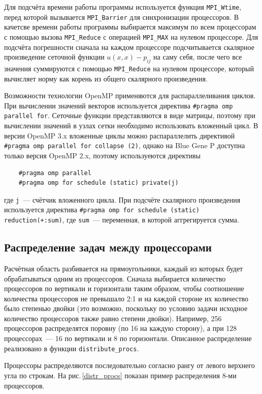 \documentclass[11pt]{article}
\numberwithin{equation}{section}
\theoremstyle{plain}
\theoremstyle{definition}
\begin{document}
Для подсчёта времени работы программы используется функция \verb|MPI_Wtime|,
перед которой вызывается \verb|MPI_Barrier| для синхронизации процессоров.
В качетсве времени работы программы выбирается максимум по всем процессорам
с помощью вызова \verb|MPI_Reduce| с операцией \verb|MPI_MAX| на нулевом
процессоре. Для подсчёта погрешности сначала на каждом процессоре
подсчитывается скалярное произведение сеточной функции $u(x, x)-p_{ij}$ на
саму себя, после чего все значения суммируются с помощью \verb|MPI_Reduce|
на нулевом процессоре, который вычисляет норму как корень из общего скалярного
произведения.

Возможности технологии OpenMP применяются для распараллеливания циклов.
При вычислении значений векторов используется директива
\verb|#pragma omp parallel for|. Сеточные функции представляются в виде
матрицы, поэтому при вычислении значений в узлах сетки необходимо использовать
вложенный цикл. В версии OpenMP 3.x вложенные циклы можно распараллелить
директивой \verb|#pragma omp parallel for collapse (2)|, однако на Blue Gene P
доступна только версия OpenMP 2.x, поэтому используеются директивы
\begin{verbatim}
    #pragma omp parallel
    #pragma omp for schedule (static) private(j)
\end{verbatim}
где \verb|j|~--- счётчик вложенного цикла.
При подсчёте скалярного произведения используется директива
\verb|#pragma omp for schedule (static) reduction(+:sum)|,
где \verb|sum|~--- переменная, в которой аггрегируется сумма.

\subsection{Распределение задач между процессорами}
Расчётная область разбивается на прямоугольники, каждый из которых будет
обрабатываться одним из процессоров. Сначала выбирается количество
процессоров по вертикали и горизонтали таким образом, чтобы соотношение
количества процессоров не превышало 2:1 и на каждой стороне их количество
было степенью двойки (это возможно, поскольку по условию задачи исходное
количество процессоров также равно степени двойки). Например, 256 процессоров
распределятся поровну (по 16 на каждую сторону), а при 128 процессорах~---
16 по вертикали и 8 по горизонтали.
Описанное распределение реализовано в функции \verb|distribute_procs|.

Процессоры распределяются последовательно согласно рангу от левого верхнего угла
по строкам. На рис.\,\ref{distr_procs} показан пример распределения 8-ми
процессоров.
\end{document}

